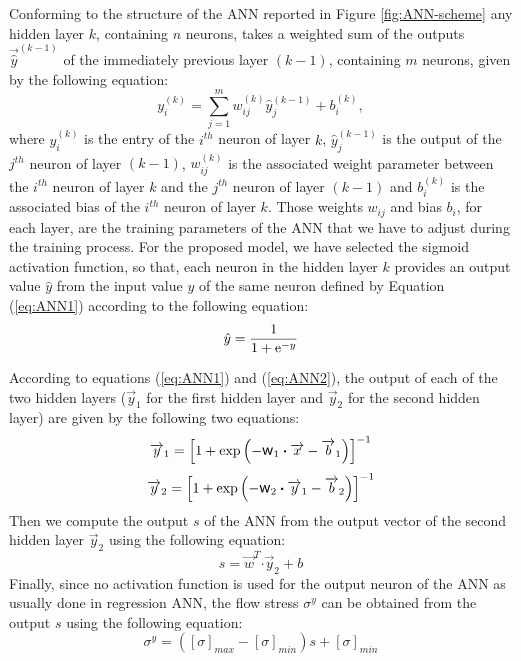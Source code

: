 \documentclass[algorithms,article,submit,pdftex,moreauthors]{Definitions/mdpi}
\DeclareRobustCommand{\w}{\mbox{\large\ensuremath{\mathsf{w}}}}
\DeclareRobustCommand{\dotp}{\boldsymbol{\cdot}}
\DeclareRobustCommand{\e}[1]{{\rm e}^{#1}}
\DeclareRobustCommand{\lay}[1]{^{(#1)}}
\begin{document}
Conforming to the structure of the ANN reported in Figure \ref{fig:ANN-scheme} any hidden layer $k$, containing $n$ neurons, takes a weighted sum of the outputs $\overrightarrow{\hat{y}}^{(k-1)}$ of the immediately previous layer $(k-1)$, containing $m$ neurons, given by the following equation:
\begin{equation}
y_i\lay{k} = \sum_{j=1}^m w_{ij}\lay{k} \hat{y}_j^{(k-1)}+ b_i\lay{k},\label{eq:ANN1}
\end{equation}
where $y_i\lay{k}$ is the entry of the $i^{th}$ neuron of layer $k$, $\hat{y}_j\lay{k-1}$ is the output of the $j^{th}$ neuron of layer $(k-1)$, $w_{ij}\lay{k}$ is the associated weight parameter between the $i^{th}$ neuron of layer $k$ and the $j^{th}$ neuron of layer $(k-1)$ and $b_i\lay{k}$ is the associated bias of the $i^{th}$ neuron of layer $k$.
Those weights $w_{ij}$ and bias $b_i$, for each layer, are the training parameters of the ANN that we have to adjust during the training process.
For the proposed model, we have selected the sigmoid activation function, so that, each neuron in the hidden layer $k$ provides an output value ${\hat{y}}$ from the input value $y$ of the same neuron defined by Equation (\ref{eq:ANN1}) according to the following equation:
\begin{equation}
\hat{y}=\frac{1}{1 + \e{-y}}\label{eq:ANN2}
\end{equation}

According to equations (\ref{eq:ANN1}) and (\ref{eq:ANN2}), the output of each of the two hidden layers ($\overrightarrow{y}_1$ for the first hidden layer and $\overrightarrow{y}_2$ for the second hidden layer) are given by the following two equations:
\begin{equation}
\overrightarrow{y}_1 = \left[1 + \exp{\left(- \w_1 \dotp \overrightarrow{x}- \overrightarrow{b}_1\right)}\right]^{-1}\label{eq:ANN3}
\end{equation}
\begin{equation}
\overrightarrow{y}_2 = \left[1 + \exp{\left(- \w_2 \dotp \overrightarrow{y}_1- \overrightarrow{b}_2\right)}\right]^{-1}\label{eq:ANN4}
\end{equation}
Then we compute the output $s$ of the ANN from the output vector of the second hidden layer $\overrightarrow{y}_2$ using the following equation:
\begin{equation}
s = \overrightarrow{w}^T \dotp \overrightarrow{y}_2 + b\label{eq:ANN5}
\end{equation}
Finally, since no activation function is used for the output neuron of the ANN as usually done in regression ANN, the flow stress $\sigma^y$ can be obtained from the output $s$ using the following equation:
\begin{equation}
\sigma^y =  \left([\sigma]_{max}-[\sigma]_{min}\right)s + [\sigma]_{min} \label{eq:CR2}
\end{equation}
\end{document}

